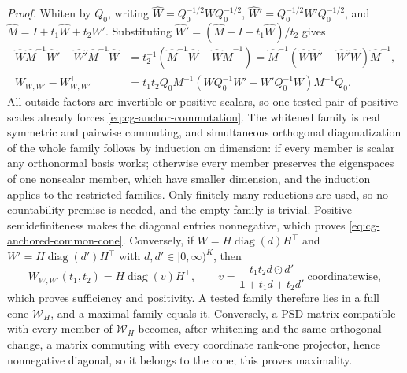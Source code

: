 \noindent\emph{Proof.}
Whiten by \(Q_0\), writing \(\widehat W=Q_0^{-1/2}WQ_0^{-1/2}\),
\(\widehat W'=Q_0^{-1/2}W'Q_0^{-1/2}\), and
\(\widehat M=I+t_1\widehat W+t_2\widehat W'\). Substituting
\(\widehat W'=(\widehat M-I-t_1\widehat W)/t_2\) gives
\begin{equation}
\begin{aligned}
\widehat W\widehat M^{-1}\widehat W'-\widehat W'\widehat M^{-1}\widehat W
 &=t_2^{-1}(\widehat M^{-1}\widehat W-\widehat W\widehat M^{-1})
  =\widehat M^{-1}(\widehat W\widehat W'-\widehat W'\widehat W)\widehat M^{-1},\\
W_{W,W'}-W_{W,W'}^\top
 &=t_1t_2Q_0M^{-1}(WQ_0^{-1}W'-W'Q_0^{-1}W)M^{-1}Q_0.
\end{aligned}
\label{eq:cg-exact-pair-antisymmetry}
\end{equation}
All outside factors are invertible or positive scalars, so one tested pair of
positive scales already forces \eqref{eq:cg-anchor-commutation}. The whitened
family is real symmetric and pairwise commuting, and simultaneous orthogonal
diagonalization of the whole family follows by induction on dimension: if every
member is scalar any orthonormal basis works; otherwise every member preserves
the eigenspaces of one nonscalar member, which have smaller dimension, and the
induction applies to the restricted families. Only finitely many reductions are
used, so no countability premise is needed, and the empty family is trivial.
Positive semidefiniteness makes the diagonal entries nonnegative, which proves
\eqref{eq:cg-anchored-common-cone}. Conversely, if \(W=H\operatorname{diag}(d)H^\top\)
and \(W'=H\operatorname{diag}(d')H^\top\) with \(d,d'\in[0,\infty)^K\), then
\begin{equation}
W_{W,W'}(t_1,t_2)=
H\operatorname{diag}(v)H^\top,
\qquad
v=\frac{t_1t_2 d\odot d'}{\mathbf 1+t_1d+t_2d'}\ \text{coordinatewise},
\label{eq:cg-independent-diagonal-output}
\end{equation}
which proves sufficiency and positivity. A tested family therefore lies in a
full cone \(\mathcal W_H\), and a maximal family equals it. Conversely, a PSD
matrix compatible with every member of \(\mathcal W_H\) becomes, after
whitening and the same orthogonal change, a matrix commuting with every
coordinate rank-one projector, hence nonnegative diagonal, so it belongs to the
cone; this proves maximality.

